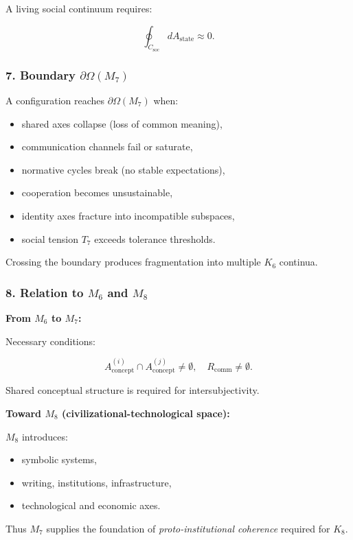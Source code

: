 A living social continuum requires:

\[
\oint_{C_{\mathrm{soc}}} dA_{\mathrm{state}} \approx 0.
\]

\subsubsection*{7. Boundary \texorpdfstring{$\partial\Omega(M_7)$}{\partial\Omega(M_7)}}

A configuration reaches $\partial\Omega(M_7)$ when:

\begin{itemize}
    \item shared axes collapse (loss of common meaning),
    \item communication channels fail or saturate,
    \item normative cycles break (no stable expectations),
    \item cooperation becomes unsustainable,
    \item identity axes fracture into incompatible subspaces,
    \item social tension $T_7$ exceeds tolerance thresholds.
\end{itemize}

Crossing the boundary produces fragmentation into multiple $K_6$ continua.

\subsubsection*{8. Relation to \texorpdfstring{$M_6$}{M_6} and \texorpdfstring{$M_8$}{M_8}}

\textbf{From $M_6$ to $M_7$:}

Necessary conditions:

\[
A_{\mathrm{concept}}^{(i)} \cap A_{\mathrm{concept}}^{(j)} \neq \emptyset,
\quad
R_{\mathrm{comm}} \neq \emptyset.
\]

Shared conceptual structure is required for intersubjectivity.

\textbf{Toward $M_8$ (civilizational-technological space):}

$M_8$ introduces:

\begin{itemize}
    \item symbolic systems,
    \item writing, institutions, infrastructure,
    \item technological and economic axes.
\end{itemize}

Thus $M_7$ supplies the foundation of \emph{proto-institutional coherence} required for $K_8$.
